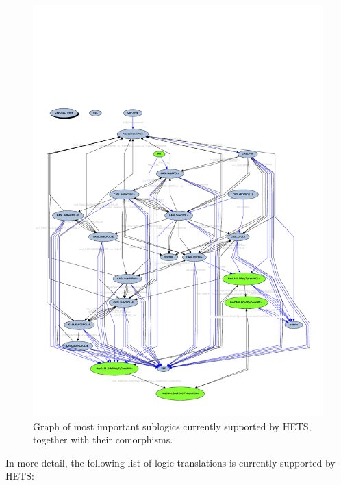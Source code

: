 \documentclass{article}
\newcommand{\normalTEXTSC}[2]{{#1\scriptsize#2}}
\newcommand     {\Hets}{\normalTEXTSC{H}{ETS}\xspace}
\begin{document}
\begin{figure}
  \begin{center}
    \includegraphics[scale=0.4]{SublogicGraph}
  \end{center}
\caption{Graph of most important sublogics currently supported by \Hets,
together with their comorphisms.}
\label{fig:SublogicGraph}
\end{figure}

In more detail, the following list of logic translations is currently
supported by \Hets:
\end{document}
